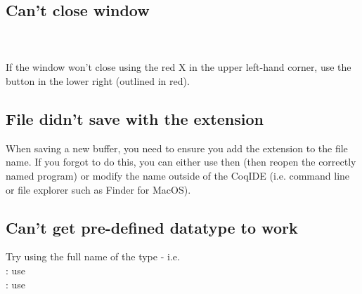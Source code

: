\subsection{Can't close  window}

\begin{minipage}{\linewidth}
        \label{fig: LoadFile} 
\end{minipage}

~\\~\\
If the  window won't close using the red X in the upper left-hand corner, 
use the  button in the lower right (outlined in red). 






\subsection{File didn't save with the  extension}

When saving a new buffer, you need to ensure you add the  extension to the file name. 
If you forgot to do this, you can either use  then  (then reopen the correctly named program)
or modify the name outside of the CoqIDE (i.e. command line or file explorer such as Finder for MacOS). 






\subsection{Can't get pre-defined datatype to work}

Try using the full name of the type - i.e.
\\ : use 
\\ : use 






